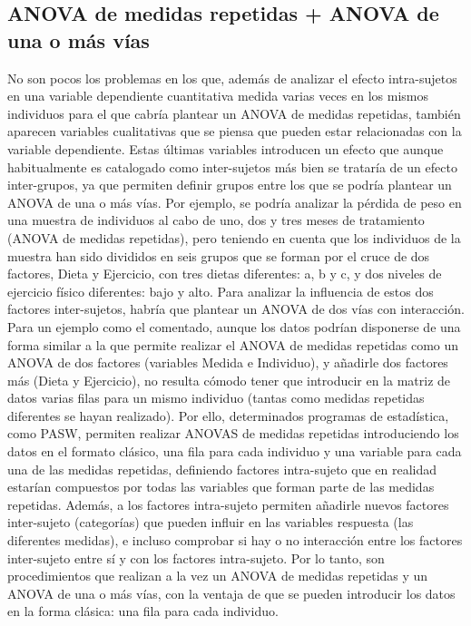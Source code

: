 \subsection{ANOVA de medidas repetidas + ANOVA de una o más vías}
No son pocos los problemas en los que, además de analizar el efecto intra-sujetos en una variable dependiente cuantitativa medida varias
veces en los mismos individuos para el que cabría plantear un ANOVA de medidas repetidas, también aparecen variables cualitativas que se
piensa que pueden estar relacionadas con la variable dependiente. Estas últimas variables introducen un efecto que aunque habitualmente es
catalogado como inter-sujetos más bien se trataría de un efecto inter-grupos, ya que permiten definir grupos entre los que se podría
plantear un ANOVA de una o más vías. Por ejemplo, se podría analizar la pérdida de peso en una muestra de individuos al cabo de uno, dos y
tres meses de tratamiento (ANOVA de medidas repetidas), pero teniendo en cuenta que los individuos de la muestra han sido divididos en seis
grupos que se forman por el cruce de dos factores, Dieta y Ejercicio, con tres dietas diferentes: a, b y c, y dos niveles de ejercicio
físico diferentes: bajo y alto. Para analizar la influencia de estos dos factores inter-sujetos, habría que plantear un ANOVA de dos vías
con interacción. Para un ejemplo como el comentado, aunque los datos podrían disponerse de una forma similar a la que permite realizar el
ANOVA de medidas repetidas como un ANOVA de dos factores (variables Medida e Individuo), y añadirle dos factores más (Dieta y Ejercicio), no
resulta cómodo tener que introducir en la matriz de datos varias filas para un mismo individuo (tantas como medidas repetidas diferentes se
hayan realizado). Por ello, determinados programas de estadística, como PASW, permiten realizar ANOVAS de medidas repetidas introduciendo
los datos en el formato clásico, una fila para cada individuo y una variable para cada una de las medidas repetidas, definiendo factores
intra-sujeto que en realidad estarían compuestos por todas las variables que forman parte de las medidas repetidas. Además, a los factores
intra-sujeto permiten añadirle nuevos factores inter-sujeto (categorías) que pueden influir en las variables respuesta (las diferentes
medidas), e incluso comprobar si hay o no interacción entre los factores inter-sujeto entre sí y con los factores intra-sujeto. Por lo
tanto, son procedimientos que realizan a la vez un ANOVA de medidas repetidas y un ANOVA de una o más vías, con la ventaja de que se pueden
introducir los datos en la forma clásica: una fila para cada individuo.

